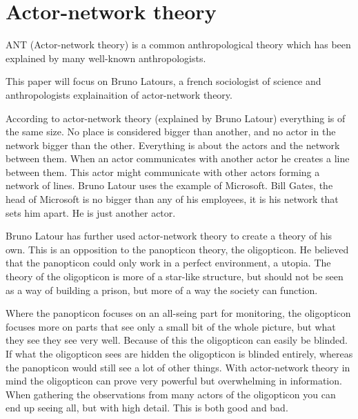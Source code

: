 \section{Actor-network theory}
ANT (Actor-network theory) is a common anthropological theory which has been explained by many well-known anthropologists.

This paper will focus on Bruno Latours, a french sociologist of science and anthropologists explainaition of actor-network theory.

According to actor-network theory (explained by Bruno Latour) everything is of the same size. No place is considered bigger than another, and no actor in the network bigger than the other. Everything is about the actors and the network between them. When an actor communicates with another actor he creates a line between them. This actor might communicate with other actors forming a network of lines.
Bruno Latour uses the example of Microsoft. Bill Gates, the head of Microsoft is no bigger than any of his employees, it is his network that sets him apart. He is just another actor.\cite{bookref:actor-network}

Bruno Latour has further used actor-network theory to create a theory of his own. This is an opposition to the panopticon theory, the oligopticon. He believed that the panopticon could only work in a perfect environment, a utopia. The theory of the oligopticon is more of a star-like structure, but should not be seen as a way of building a prison, but more of a way the society can function.

Where the panopticon focuses on an all-seing part for monitoring, the oligopticon focuses more on parts that see only a small bit of the whole picture, but what they see they see very well. Because of this the oligopticon can easily be blinded. If what the oligopticon sees are hidden the oligopticon is blinded entirely, whereas the panopticon would still see a lot of other things. With actor-network theory in mind the oligopticon can prove very powerful but overwhelming in information. When gathering the observations from many actors of the oligopticon you can end up seeing all, but with high detail. This is both good and bad.
